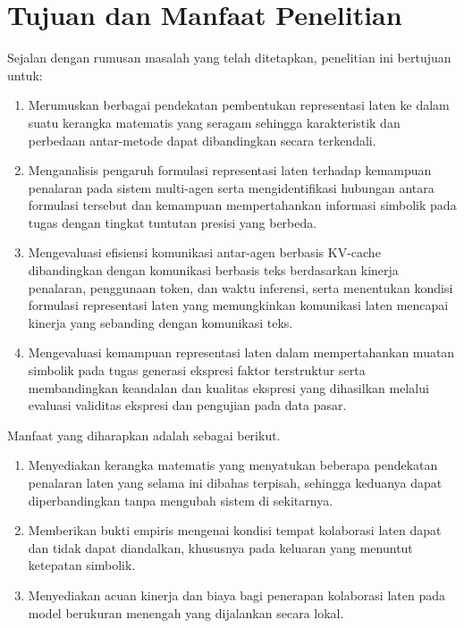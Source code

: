 \section{Tujuan dan Manfaat Penelitian}

Sejalan dengan rumusan masalah yang telah ditetapkan, penelitian ini bertujuan untuk:

\begin{enumerate}

      \item Merumuskan berbagai pendekatan pembentukan representasi laten ke dalam
            suatu kerangka matematis yang seragam sehingga karakteristik dan
            perbedaan antar-metode dapat dibandingkan secara terkendali.

      \item Menganalisis pengaruh formulasi representasi laten terhadap kemampuan
            penalaran pada sistem multi-agen serta mengidentifikasi hubungan
            antara formulasi tersebut dan kemampuan mempertahankan informasi
            simbolik pada tugas dengan tingkat tuntutan presisi yang berbeda.

      \item Mengevaluasi efisiensi komunikasi antar-agen berbasis KV-cache
            dibandingkan dengan komunikasi berbasis teks berdasarkan kinerja
            penalaran, penggunaan token, dan waktu inferensi, serta menentukan
            kondisi formulasi representasi laten yang memungkinkan komunikasi
            laten mencapai kinerja yang sebanding dengan komunikasi teks.

      \item Mengevaluasi kemampuan representasi laten dalam mempertahankan muatan
            simbolik pada tugas generasi ekspresi faktor terstruktur serta
            membandingkan keandalan dan kualitas ekspresi yang dihasilkan melalui
            evaluasi validitas ekspresi dan pengujian pada data pasar.

\end{enumerate}


Manfaat yang diharapkan adalah sebagai berikut.

\begin{enumerate}
    \item Menyediakan kerangka matematis yang menyatukan beberapa pendekatan
          penalaran laten yang selama ini dibahas terpisah, sehingga
          keduanya dapat diperbandingkan tanpa mengubah sistem di sekitarnya.
    \item Memberikan bukti empiris mengenai kondisi tempat kolaborasi laten
          dapat dan tidak dapat diandalkan, khususnya pada keluaran yang
          menuntut ketepatan simbolik.
    \item Menyediakan acuan kinerja dan biaya bagi penerapan kolaborasi laten
          pada model berukuran menengah yang dijalankan secara lokal.
\end{enumerate}

